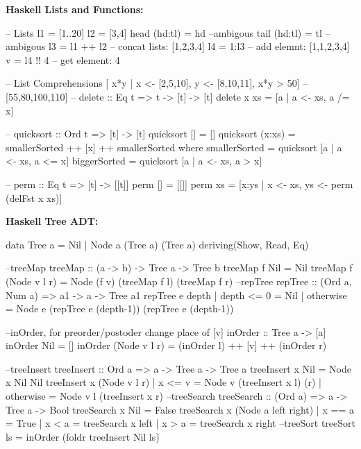 \begin{breakbox}
\textbf{Haskell Lists and Functions:}\\
\begin{haskellcode}
-- Lists
l1 = [1..20]
l2 = [3,4]
head (hd:tl) = hd --ambigous
tail (hd:tl) = tl --ambigous
l3 = l1 ++ l2 -- concat lists: [1,2,3,4]
l4 = 1:l3 -- add elemnt: [1,1,2,3,4]
v = l4 !! 4 -- get element: 4
	
-- List Comprehensions
[ x*y | x <- [2,5,10], y <- [8,10,11], x*y > 50]  -- [55,80,100,110]
-- delete :: Eq t => t -> [t] -> [t]
delete x xs = [a | a <- xs, a /= x]
 
-- quicksort :: Ord t => [t] -> [t]
quicksort [] = []  
quicksort (x:xs) = smallerSorted ++ [x] ++ smallerSorted
	where
		smallerSorted = quicksort [a | a <- xs, a <= x]
		biggerSorted = quicksort [a | a <- xs, a > x]

-- perm :: Eq t => [t] -> [[t]]
perm [] = [[]]
perm xs = [x:ys | x <- xs, ys <- perm (delFst x xs)]
\end{haskellcode}
\end{breakbox}

\begin{breakbox}
\textbf{Haskell Tree ADT:}\\
\begin{haskellcode}
data Tree a = Nil | Node a (Tree a) (Tree a) 
			deriving(Show, Read, Eq)

--treeMap
treeMap :: (a -> b) -> Tree a -> Tree b
treeMap f Nil = Nil
treeMap f (Node v l r) = Node (f v) (treeMap f l) (treeMap f r)
--repTree
repTree :: (Ord a, Num a) => a1 -> a -> Tree a1
repTree e depth 
    | depth <= 0 = Nil
    | otherwise  = Node e (repTree e (depth-1)) 
    			(repTree e (depth-1))

--inOrder, for preorder/postoder change place of [v]
inOrder :: Tree a -> [a]
inOrder Nil = []
inOrder (Node v l r) = (inOrder l) ++ [v] ++ (inOrder r)

--treeInsert
treeInsert :: Ord a => a -> Tree a -> Tree a
treeInsert x Nil = Node x Nil Nil
treeInsert x (Node v l r) | x <= v = Node v (treeInsert x l) (r) 
                          | otherwise = Node v l (treeInsert x r)
--treeSearch                          
treeSearch :: (Ord a) => a -> Tree a -> Bool  
treeSearch x Nil = False  
treeSearch x (Node a left right)  
    | x == a = True  
    | x < a  = treeSearch x left  
    | x > a  = treeSearch x right
--treeSort
treeSort ls = inOrder (foldr treeInsert Nil ls)
\end{haskellcode}
\end{breakbox}



